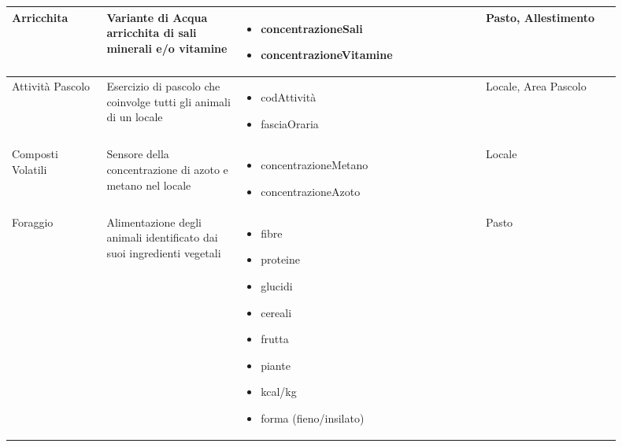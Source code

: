 \documentclass[12pt,a4paper]{article}
\begin{document}
\begin{center}
\begin{longtable}{|p{0.14\linewidth}|p{0.20\linewidth}|p{0.36\linewidth}|p{0.20\linewidth}|}
\hline
Arricchita			&  Variante di Acqua arricchita di sali minerali e/o vitamine 
					& \begin{itemize}
						\setlength{\itemindent}{-1em}
						\vspace{-25pt}
						\setlength\itemsep{-0.25em}
						\item concentrazioneSali
						\item concentrazioneVitamine
					\end{itemize}
					&  Pasto, Allestimento \\

\hline
Attività Pascolo 	&  Esercizio di pascolo che coinvolge tutti gli animali di un locale 
					& \begin{itemize}
						\setlength{\itemindent}{-1em}
						\vspace{-25pt}
						\setlength\itemsep{-0.25em}
						\item codAttività
						\item fasciaOraria
						
						
					\end{itemize}
					&  Locale, Area Pascolo \\

\hline
Composti Volatili 	&  Sensore della concentrazione di azoto e metano nel locale  
					& \begin{itemize}
						\setlength{\itemindent}{-1em}
						\vspace{-25pt}
						\setlength\itemsep{-0.25em}
						\item concentrazioneMetano
						\item concentrazioneAzoto
					\end{itemize}
					&  Locale \\

\hline
Foraggio 			&  Alimentazione degli animali identificato dai suoi ingredienti vegetali 
					& \begin{itemize}
						\setlength{\itemindent}{-1em}
						\vspace{-25pt}
						\setlength\itemsep{-0.25em}
						\item fibre
						\item proteine
						\item glucidi
						\item cereali
						\item frutta
						\item piante
						\item kcal/kg
						\item forma (fieno/insilato)
					\end{itemize}
					&  Pasto \\


\end{longtable}
\end{center}
\end{document}
